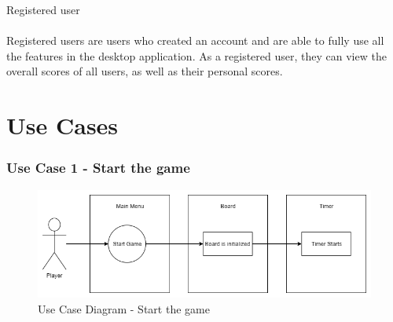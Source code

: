 \documentclass[12pt]{article}
\begin{document}
Registered user\\\\
Registered users are users who created an account and are able to fully use all the features in the desktop application. As a registered user, they can view the overall scores of all users, as well as their personal scores.\\


\section{Use Cases}
\subsubsection{Use Case 1 - Start the game} \label{uc:1}

\begin{figure}[htbp]
    \centering
    \includegraphics[scale=0.6]{StartGame}
    \caption{Use Case Diagram - Start the game}
    \label{fig:StartGame}
\end{figure}
\end{document}
